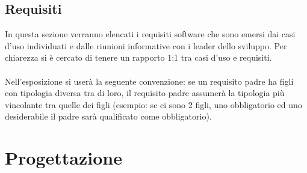 \documentclass[a4paper,13pt,twoside]{article}
\begin{document}
\subsection{Requisiti} \label{sec:req}
In questa sezione verranno elencati i requisiti software che sono emersi dai casi d'uso individuati e dalle riunioni informative con i leader dello sviluppo. Per chiarezza si è cercato di tenere un rapporto 1:1 tra casi d'uso e requisiti.
 \\ \\Nell'esposizione si userà la seguente convenzione: se un requisito padre ha figli con tipologia diversa tra di loro, il requisito padre assumerà la tipologia più vincolante tra quelle dei figli (esempio: se ci sono 2 figli, uno obbligatorio ed uno desiderabile il padre sarà qualificato come obbligatorio).
 

\newpage

\newpage

\section{Progettazione} \label{sec:progett}
\end{document}
